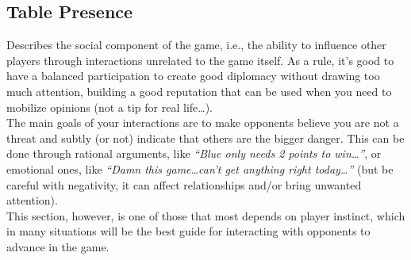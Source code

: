 \documentclass[12pt]{article}
\begin{document}
\subsection{Table Presence}
Describes the social component of the game, i.e., the ability to influence other players through interactions unrelated to the game itself.
As a rule, it's good to have a balanced participation to create good diplomacy without drawing too much attention, building a good reputation that can be used when you need to mobilize opinions (not a tip for real life\dots). \\
The main goals of your interactions are to make opponents believe you are not a threat and subtly (or not) indicate that others are the bigger danger.
This can be done through rational arguments, like \textit{``Blue only needs 2 points to win\dots''}, or emotional ones, like \textit{``Damn this game\dots can't get anything right today\dots''} (but be careful with negativity, it can affect relationships and/or bring unwanted attention). \\
This section, however, is one of those that most depends on player instinct, which in many situations will be the best guide for interacting with opponents to advance in the game.
\end{document}
